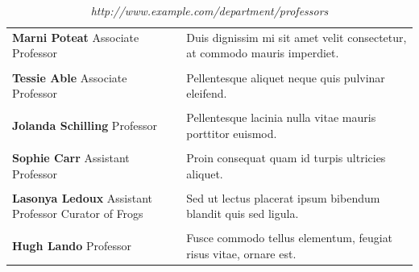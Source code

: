 \documentclass{book} %
\begin{document}
\begin{table}[ht!]
\begin{tabular}{p{2.5in} p{4.5in}}
\textbf{Marni Poteat} \newline Associate Professor & Duis dignissim mi sit amet velit consectetur, at commodo mauris imperdiet.\\ \\
\textbf{Tessie Able} \newline Associate Professor &  Pellentesque aliquet neque quis pulvinar eleifend.\\ \\
\textbf{Jolanda Schilling} \newline Professor & Pellentesque lacinia nulla vitae mauris porttitor euismod.\\ \\
\textbf{Sophie Carr} \newline Assistant Professor & Proin consequat quam id turpis ultricies aliquet.\\ \\
\textbf{Lasonya Ledoux} \newline Assistant Professor \newline Curator of Frogs & Sed ut lectus placerat ipsum bibendum blandit quis sed ligula.\\ \\
\textbf{Hugh Lando} \newline Professor & Fusce commodo tellus elementum, feugiat risus vitae, ornare est.

\end{tabular}
\caption*{\textit{http://www.example.com/department/professors}}
\end{table}

\clearpage

\clearpage
\end{document}
